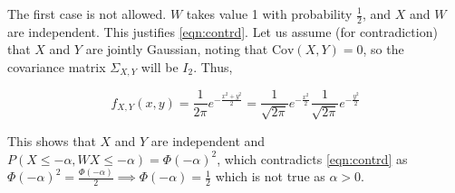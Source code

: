 \documentclass{article}
\begin{document}
The first case is not allowed. \( W \) takes value 1 with probability \( \frac{1}{2} \), and \( X \) and \( W \) are independent. This justifies \autoref{eqn:contrd}. Let us assume (for contradiction) that \( X \) and \( Y \) are jointly Gaussian, noting that \( \text{Cov}(X, Y) = 0 \), so the covariance matrix \( \Sigma_{X,Y} \) will be \( I_2 \). Thus,

\begin{equation*}
f_{X,Y}(x, y) = \frac{1}{2\pi} e^{-\frac{x^2 + y^2}{2}} = \frac{1}{\sqrt{2\pi}} e^{-\frac{x^2}{2}} \frac{1}{\sqrt{2\pi}} e^{-\frac{y^2}{2}}   
\end{equation*}

This shows that \( X \) and \( Y \) are independent and \( P(X \leq -\alpha, WX \leq -\alpha) = \Phi(-\alpha)^2 \), which contradicts \autoref{eqn:contrd} as \( \Phi(-\alpha)^2 =  \frac{\Phi(-\alpha)}{2} \implies \Phi(-\alpha) = \frac{1}{2}\) which is not true as $\alpha > 0$.
\end{document}
